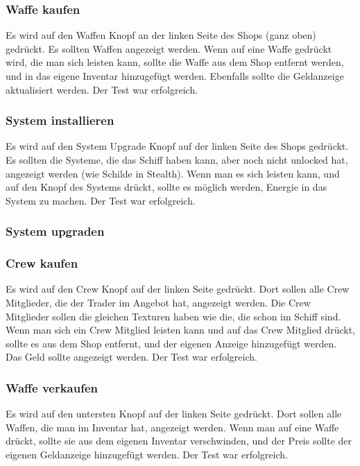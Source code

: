 \documentclass[fontsize=12pt,paper=a4,twoside]{scrartcl}
\begin{document}
\subsubsection{Waffe kaufen}
Es wird auf den Waffen Knopf an der linken Seite des Shops (ganz oben) gedrückt. Es sollten Waffen angezeigt werden. Wenn auf eine Waffe gedrückt wird, die man sich leisten kann, sollte die Waffe aus dem Shop entfernt werden, und in das eigene Inventar hinzugefügt werden. Ebenfalls sollte die Geldanzeige aktualisiert werden.  Der Test war erfolgreich. \\
\subsubsection{System installieren}
Es wird auf den System Upgrade Knopf auf der linken Seite des Shops gedrückt. Es sollten die Systeme, die das Schiff haben kann, aber noch nicht unlocked hat, angezeigt werden (wie Schilde in Stealth). Wenn man es sich leisten kann, und auf den Knopf des Systems drückt, sollte es möglich werden, Energie in das System zu machen.  Der Test war erfolgreich. \\ 
\subsubsection{System upgraden}
\subsubsection{Crew kaufen}
Es wird auf den Crew Knopf auf der linken Seite gedrückt. Dort sollen alle Crew Mitglieder, die der Trader im Angebot hat, angezeigt werden. Die Crew Mitglieder sollen die gleichen Texturen haben wie die, die schon im Schiff sind. Wenn man sich ein Crew Mitglied leisten kann und auf das Crew Mitglied drückt, sollte es aus dem Shop entfernt, und der eigenen Anzeige hinzugefügt werden. Das Geld sollte angezeigt werden.  Der Test war erfolgreich. \\
\subsubsection{Waffe verkaufen}
Es wird auf den untersten Knopf auf der linken Seite gedrückt. Dort sollen alle Waffen, die man im Inventar hat, angezeigt werden. Wenn man auf eine Waffe drückt, sollte sie aus dem eigenen Inventar verschwinden, und der Preis sollte der eigenen Geldanzeige hinzugefügt werden.  Der Test war erfolgreich. \\
\end{document}
